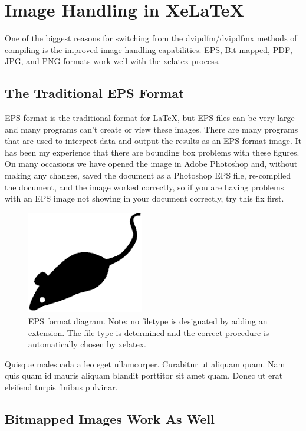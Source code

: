 \section{Image Handling in XeLaTeX}

One of the biggest reasons for switching from the dvipdfm/dvipdfmx methods of compiling is the improved image handling capabilities. EPS, Bit-mapped, PDF, JPG, and PNG formats work well with the xelatex process.

\subsection{The Traditional EPS Format}

EPS format is the traditional format for LaTeX, but EPS files can be very large and many programs can't create or view these images. There are many programs that are used to interpret data and output the results as an EPS format image. It has been my experience that there are bounding box problems with these figures. On many occasions we have opened the image in Adobe Photoshop and, without making any changes, saved the document as a Photoshop EPS file, re-compiled the document, and the image worked correctly, so if you are having problems with an EPS image not showing in your document correctly, try this fix first.


\begin{figure}[htbp]
  \centering
    \includegraphics[width=2in]{images/mouse}
    \caption[EPS format diagram. Note: no filetype is designated by adding an extension.]{EPS format diagram. Note: no filetype is designated by adding an extension. The file type is determined and the correct procedure is automatically chosen by xelatex.}
\end{figure}


Quisque malesuada a leo eget ullamcorper. Curabitur ut aliquam quam. Nam quis quam id mauris aliquam blandit porttitor sit amet quam. Donec ut erat eleifend turpis finibus pulvinar.

\subsection{Bitmapped Images Work As Well}

